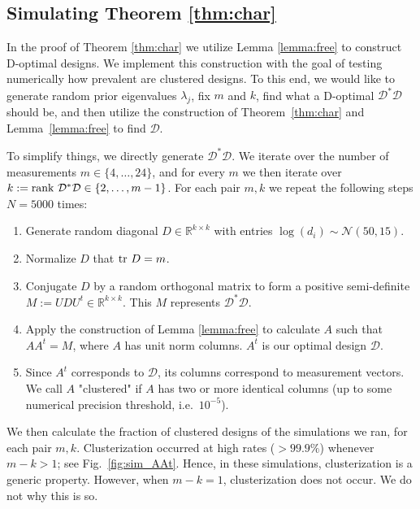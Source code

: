 \documentclass[ba]{imsart}
\newcommand{\ttr}[1]{\textup{tr}\ #1}
\newcommand{\rank}{\textup{rank}\ }
\newcommand{\opt}{\mathcal{D}}
\theoremstyle{plain}
\theoremstyle{definition}
\theoremstyle{remark}
\begin{document}
\subsection{Simulating Theorem \ref{thm:char}}\label{subsec:lemma_sims}
In the proof of Theorem \ref{thm:char} we utilize Lemma
\ref{lemma:free} to construct D-optimal designs. We implement this
construction with the goal of testing numerically how prevalent are
clustered designs. To this end, we would like to generate random prior
eigenvalues $\lambda_j$, fix $m$ and $k$, find what a D-optimal
$\opt^*\opt$ should be, and then utilize the construction of
Theorem~\ref{thm:char} and Lemma~\ref{lemma:free} to find $\opt$.


To simplify things, we directly generate $\opt^*\opt$. We iterate over
the number of measurements $m \in \{4,\dots, 24\}$, and for every $m$
we then iterate over $k:=\rank \opt^*\opt \in \{2,\dots, m-1\}$. For
each pair $m,k$ we repeat the following steps $N=5000$ times:
\begin{enumerate}
\item Generate random diagonal $D\in \mathbb{R}^{k\times k}$ with
  entries $\log (d_i) \sim \mathcal{N}(50,15)$.
\item Normalize $D$ that $\ttr D = m$.
\item Conjugate $D$ by a random orthogonal matrix to form a positive
  semi-definite $M := UDU^t \in \mathbb{R}^{k\times k}$. This $M$
  represents $\opt^*\opt$.
\item Apply the construction of Lemma \ref{lemma:free} to calculate
  $A$ such that $AA^t = M$, where $A$ has unit norm columns. $A^t$ is
  our optimal design $\opt$.
\item Since $A^t$ corresponds to $\opt$, its columns correspond to
  measurement vectors. We call $A$ "clustered" if $A$ has two or more
  identical columns (up to some numerical precision threshold,
  i.e.~$10^{-5}$).
\end{enumerate}
We then calculate the fraction of clustered designs of the simulations
we ran, for each pair $m,k$. Clusterization occurred at high rates
($>99.9\%$) whenever $m-k > 1$; see Fig.~\ref{fig:sim_AAt}. Hence, in
these simulations, clusterization is a generic property. However, when
$m-k = 1$, clusterization does not occur. We do not why this is so.
\end{document}
